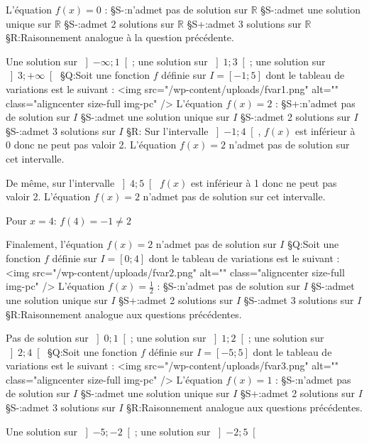 L'équation $f\left(x\right)=0$ : 
§S-:n'admet pas de solution sur $\mathbb{R}$
§S-:admet une solution unique sur $\mathbb{R}$
§S-:admet 2 solutions sur $\mathbb{R}$
§S+:admet 3 solutions sur $\mathbb{R}$
§R:Raisonnement analogue à la question précédente.
\par
Une solution sur $\left]-\infty ;1\right[$; une solution sur $\left]1;3\right[$; une solution sur $\left]3;+\infty \right[$
§Q:Soit une fonction $f$ définie sur $I=\left[-1; 5\right]$ dont le tableau de variations est le suivant :
<img src="/wp-content/uploads/fvar1.png" alt="" class="aligncenter size-full  img-pc" />
L'équation $f\left(x\right)=2$ :
§S+:n'admet pas de solution sur $I$
§S-:admet une solution unique sur $I$
§S-:admet 2 solutions sur $I$
§S-:admet 3 solutions sur $I$
§R: Sur l'intervalle $\left]-1; 4\right[$, $f\left(x\right)$ est inférieur à 0 donc ne peut pas valoir 2. L'équation $f\left(x\right)=2$ n'admet pas de solution sur cet intervalle.
\par
De même, sur l'intervalle $\left]4 ; 5\right[$ $f\left(x\right)$ est inférieur à 1 donc ne peut pas valoir 2. L'équation $f\left(x\right)=2$ n'admet pas de solution sur cet intervalle.
\par
Pour $x=4$: $f\left(4\right)=-1\neq 2$
\par
Finalement, l'équation $f\left(x\right)=2$ n'admet pas de solution sur $I$
§Q:Soit une fonction $f$ définie sur $I=\left[0; 4\right]$ dont le tableau de variations est le suivant :
<img src="/wp-content/uploads/fvar2.png" alt="" class="aligncenter size-full  img-pc" />
L'équation $f\left(x\right)=\frac{1}{2}$ :
§S-:n'admet pas de solution sur $I$
§S-:admet une solution unique sur $I$
§S+:admet 2 solutions sur $I$
§S-:admet 3 solutions sur $I$
§R:Raisonnement analogue aux questions précédentes.
\par
Pas de solution sur $\left]0;1\right[$; une solution sur $\left]1;2\right[$; une solution sur $\left]2;4\right[$
§Q:Soit une fonction $f$ définie sur $I=\left[-5; 5\right]$ dont le tableau de variations est le suivant :
<img src="/wp-content/uploads/fvar3.png" alt="" class="aligncenter size-full  img-pc" />
L'équation $f\left(x\right)=1$ :
§S-:n'admet pas de solution sur $I$
§S-:admet une solution unique sur $I$
§S+:admet 2 solutions sur $I$
§S-:admet 3 solutions sur $I$
§R:Raisonnement analogue aux questions précédentes.
\par
Une solution sur $\left]-5;-2\right[$; une solution sur $\left]-2;5\right[$
\par
